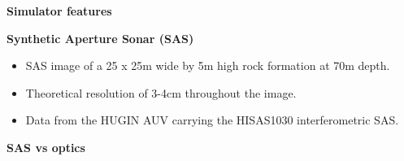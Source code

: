 \documentclass[
    beamer                                       %
  ,table,dvipsnames,svgnames
]{common/mytemplate}
\begin{document}
\renewcommand{\frametitle}[2]{{\vspace*{10pt}\bf\Large #1\par}}


\begin{frame}
\frametitle{Simulator features}
\framesubtitle{}
\begin{figure}[H]
\begin{narrow}{-0.6cm}{-0.6cm}
\end{narrow}
\end{figure}                                                                                                                                                                                                                                                                                                   
\end{frame}

\begin{frame}
\frametitle{\hspace{-.5cm}Synthetic Aperture Sonar (SAS)}
\framesubtitle{}
\vspace{-10pt}
\begin{figure}[H]
\begin{narrow}{.1cm}{-0.6cm}
\flushright\hspace{-10pt}
\end{narrow}
\end{figure}
\vspace{-10pt}
\begin{narrow}{-0.5cm}{-0.5cm}
\begin{itemize}\small
\item SAS image of a 25 x 25m wide by 5m high rock formation at 70m depth.
\item Theoretical resolution of 3-4cm throughout the image.
\item Data from the HUGIN AUV carrying the HISAS1030 interferometric SAS.
\end{itemize}
\end{narrow}
\end{frame}

{
%
\begin{frame}
\frametitle{SAS vs optics}
\framesubtitle{}
\vspace{8cm}
\end{frame}
}
\end{document}
